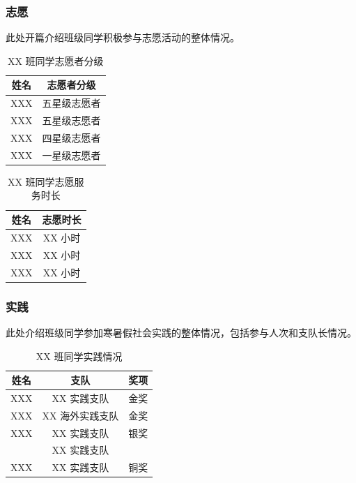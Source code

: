 \subsubsection{志愿}

此处开篇介绍班级同学积极参与志愿活动的整体情况。

\begin{table}[H]
    \centering
    \begin{tabular}{||c|c||}
        \hline
        姓名   & 志愿者分级   \\
        \hline
        XXX & 五星级志愿者 \\
        XXX & 五星级志愿者 \\
        XXX & 四星级志愿者 \\
        XXX & 一星级志愿者 \\
        \hline
    \end{tabular}
    \caption{XX 班同学志愿者分级}
\end{table}

\begin{table}[H]
    \centering
    \begin{tabular}{||c|c||}
        \hline
        姓名   & 志愿时长   \\
        \hline
        XXX & XX 小时 \\
        XXX & XX 小时 \\
        XXX & XX 小时 \\
        \hline
    \end{tabular}
    \caption{XX 班同学志愿服务时长}
\end{table}

\subsubsection{实践}

此处介绍班级同学参加寒暑假社会实践的整体情况，包括参与人次和支队长情况。

\begin{table}[H]
    \centering
    \begin{tabular}{||c|c|c||}
        \hline
        \hline
        姓名   & 支队           & 奖项 \\
        \hline
        XXX & XX 实践支队     & 金奖 \\
        \hline
        XXX & XX 海外实践支队 & 金奖 \\
        \hline
        XXX & XX 实践支队     & 银奖 \\
            & XX 实践支队     &      \\
        \hline
        XXX & XX 实践支队     & 铜奖 \\
        \hline
        \hline
    \end{tabular}
    \caption{XX 班同学实践情况}
\end{table}

